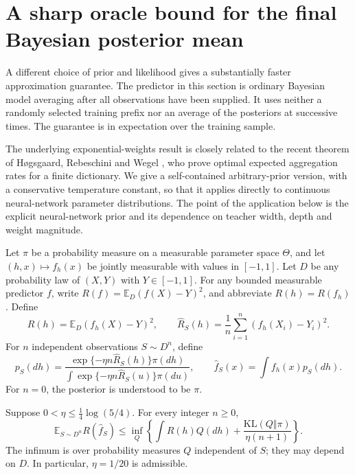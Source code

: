 
\section{A sharp oracle bound for the final Bayesian posterior mean}
\label{sec:alt-final-mean}

A different choice of prior and likelihood gives a substantially faster
approximation guarantee.  The predictor in this section is ordinary
Bayesian model averaging after all observations have been supplied.  It
uses neither a randomly selected training prefix nor an average of the
posteriors at successive times.  The guarantee is in expectation over the
training sample.

The underlying exponential-weights result is closely related to the
recent theorem of H\o gsgaard, Rebeschini and Wegel
\cite{hrw}, who prove optimal expected aggregation
rates for a finite dictionary.  We give a self-contained arbitrary-prior
version, with a conservative temperature constant, so that it applies
directly to continuous neural-network parameter distributions.  The
point of the application below is the explicit neural-network prior and
its dependence on teacher width, depth and weight magnitude.

Let $\pi$ be a probability measure on a measurable parameter space
$\Theta$, and let $(h,x)\mapsto f_h(x)$ be jointly measurable with values
in $[-1,1]$.  Let $D$ be any probability law of $(X,Y)$ with
$Y\in[-1,1]$.  For any bounded measurable predictor $f$, write
$R(f)=\mathbb E_D(f(X)-Y)^2$, and abbreviate $R(h)=R(f_h)$.
Define
\[
 R(h)=\mathbb E_D(f_h(X)-Y)^2,
 \qquad
 \widehat R_S(h)=\frac1n\sum_{i=1}^n(f_h(X_i)-Y_i)^2.
\]
For $n$ independent observations $S\sim D^n$, define
\begin{equation}
 p_S(dh)=
 \frac{\exp\{-\eta n\widehat R_S(h)\}\pi(dh)}
 {\int\exp\{-\eta n\widehat R_S(u)\}\pi(du)},
 \qquad
 \widehat f_S(x)=\int f_h(x)p_S(dh).
 \label{eq:alt-gibbs}
\end{equation}
For $n=0$, the posterior is understood to be $\pi$.

\begin{theorem}
\label{thm:alt-final-mean}
Suppose $0<\eta\le \frac14\log(5/4)$.  For every integer $n\ge0$,
\begin{equation}
 \mathbb E_{S\sim D^n}R(\widehat f_S)
 \le
 \inf_Q\left\{
     \int R(h)Q(dh)
       +\frac{\mathrm{KL}(Q\Vert\pi)}{\eta(n+1)}
       \right\}.
 \label{eq:alt-final-oracle}
\end{equation}
The infimum is over probability measures $Q$ independent of $S$; they
may depend on $D$.  In particular, $\eta=1/20$ is admissible.
\end{theorem}

